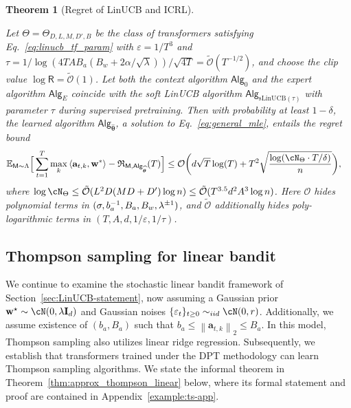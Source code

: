 \documentclass[10pt]{article}
\newtheorem{theorem}{Theorem}
\newcommand{\id}{\bI}
\newcommand{\eps}{\varepsilon}
\newcommand{\norm}[1]{\left\|{#1}\right\|}
\newcommand{\ltwo}[1]{\norm{#1}_2}
\renewcommand{\cO}{\mathcal{O}}
\newcommand{\<}{\left\langle}
\renewcommand{\>}{\right\rangle}
\newcommand{\mat}[1]{\ensuremath{\mathbf{#1}}}
\newcommand{\E}{\mathbb{E}}
\newcommand{\B}{\mat{B}}
\newcommand{\inst}{{\mathsf{M}}}
\newcommand{\sLinUCB}{{\mathrm{sLinUCB}}}
\newcommand{\temp}{{\tau}}
\newcommand{\Tpspar}{{\lambda}}
\newcommand{\Tpsparn}{{r}}
\newcommand{\tcO}{{\tilde{\mathcal O}}}
\newcommand{\totlen}{{T}}
\newcommand{\sAlg}{{\mathsf{Alg}}}
\newcommand{\Numobs}{{n}}
\newcommand{\Parspace}{{\Theta}}
\newcommand{\esttfpar}{{\widehat{\btheta}}}
\newcommand{\prior}{{\Lambda}}
\newcommand{\shortexp}{{E}}
\newcommand{\layer}{{L}}
\newcommand{\hidden}{{D'}}
\newcommand{\head}{{M}}
\newcommand{\clipval}{{\mathsf{R}}}
\newcommand{\embd}{{D}}
\newcommand{\totreward}{{\mathfrak{R}}}
\newcommand{\Numact}{{A}}
\def\bI{{\mathbf I}}
\def\btheta{{\boldsymbol \theta}}
\def\ba{{\mathbf a}}
\def\bw{{\mathbf w}}
\begin{document}
\begin{theorem}[Regret of LinUCB and ICRL]\label{thm:smooth_linucb}






Let $\Theta = \Theta_{D, L, M, \hidden, B}$ be the class of transformers satisfying Eq.~\eqref{eq:linucb_tf_param} with $\eps=1/\totlen^3$ and $\temp = 1/ \log(4\totlen\Numact B_a(B_w+2\alpha/\sqrt{\lambda}))/\sqrt{4\totlen}=\tcO(\totlen^{-1/2})$, and choose the clip value $\log\clipval = \tcO(1)$. Let both the context algorithm $\sAlg_0$ and the expert algorithm $\sAlg_\shortexp$ coincide with the soft LinUCB algorithm $\sAlg_{\sLinUCB(\tau)}$ with parameter $\tau$ during supervised pretraining. Then with probability at least $1-\delta$, the learned algorithm $\sAlg_{\esttfpar}$, a solution to Eq.~\eqref{eq:general_mle}, entails the regret bound
\begin{align*}
\E_{\inst\sim\prior}\Big[\sum_{t=1}^\totlen\max_{k}\<\ba_{t,k},\bw^*\>-\totreward_{\inst,\sAlg_\esttfpar}(\totlen)\Big]&\leq   \cO\bigg( d\sqrt{\totlen}\log(\totlen)+ \totlen^2\sqrt{\frac{\log ( \cN_{\Parspace} \cdot \totlen/\delta )}{n} } \bigg),

\end{align*}
where $\log \cN_{\Parspace} \le \tcO(\layer^2\embd(\head\embd+\hidden) \log\Numobs) \leq \tcO(\totlen^{3.5} d^2 \Numact^3\log\Numobs)$. Here $\cO$ hides polynomial terms in $(\sigma, b_a^{-1}, B_a, \\B_w, \lambda^{\pm1})$, and $\tcO$ additionally hides poly-logarithmic terms in $(\totlen, \Numact, d, 1/\eps,1/\temp)$. 
\end{theorem}




\subsection{Thompson sampling for linear bandit}\label{sec:TS-statement}


We continue to examine the stochastic linear bandit framework of Section~\ref{sec:LinUCB-statement}, now assuming a Gaussian prior $\bw^\star\sim \cN(0,\Tpspar\id_d)$ and Gaussian noises $\{ \eps_t \}_{t \ge 0} \sim_{iid} \cN(0,\Tpsparn)$. Additionally, we assume existence of $(b_a, B_a)$ such that $b_a\leq\ltwo{\ba_{t,k}}\leq B_a$. In this model, Thompson sampling also utilizes linear ridge regression. Subsequently, we establish that transformers trained under the DPT methodology can learn Thompson sampling algorithms. We state the informal theorem in Theorem~\ref{thm:approx_thompson_linear} below, where its formal statement and proof are contained in Appendix~\ref{example:ts-app}. 
\end{document}
